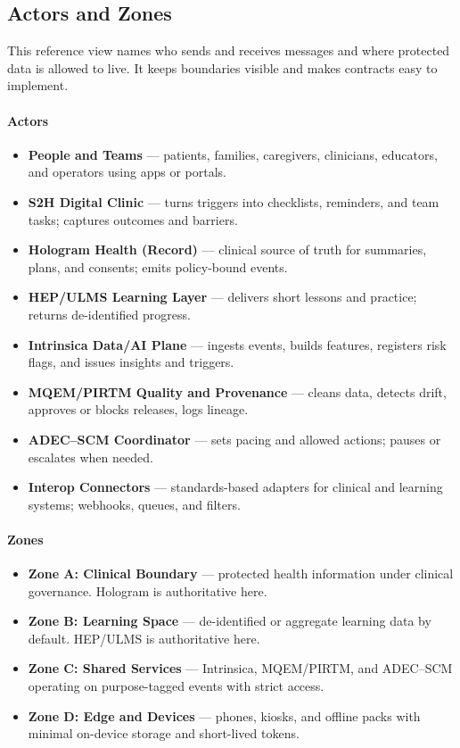 \documentclass[12pt]{article}
\begin{document}
\subsection*{Actors and Zones}
This reference view names who sends and receives messages and where protected data is allowed to live. It keeps boundaries visible and makes contracts easy to implement.

\paragraph{Actors}
\begin{itemize}[leftmargin=*]
  \item \textbf{People and Teams} — patients, families, caregivers, clinicians, educators, and operators using apps or portals.
  \item \textbf{S2H Digital Clinic} — turns triggers into checklists, reminders, and team tasks; captures outcomes and barriers.
  \item \textbf{Hologram Health (Record)} — clinical source of truth for summaries, plans, and consents; emits policy-bound events.
  \item \textbf{HEP/ULMS Learning Layer} — delivers short lessons and practice; returns de-identified progress.
  \item \textbf{Intrinsica Data/AI Plane} — ingests events, builds features, registers risk flags, and issues insights and triggers.
  \item \textbf{MQEM/PIRTM Quality and Provenance} — cleans data, detects drift, approves or blocks releases, logs lineage.
  \item \textbf{ADEC--SCM Coordinator} — sets pacing and allowed actions; pauses or escalates when needed.
  \item \textbf{Interop Connectors} — standards-based adapters for clinical and learning systems; webhooks, queues, and filters.
\end{itemize}

\paragraph{Zones}
\begin{itemize}[leftmargin=*]
  \item \textbf{Zone A: Clinical Boundary} — protected health information under clinical governance. Hologram is authoritative here.
  \item \textbf{Zone B: Learning Space} — de-identified or aggregate learning data by default. HEP/ULMS is authoritative here.
  \item \textbf{Zone C: Shared Services} — Intrinsica, MQEM/PIRTM, and ADEC--SCM operating on purpose-tagged events with strict access.
  \item \textbf{Zone D: Edge and Devices} — phones, kiosks, and offline packs with minimal on-device storage and short-lived tokens.
\end{itemize}
\end{document}
